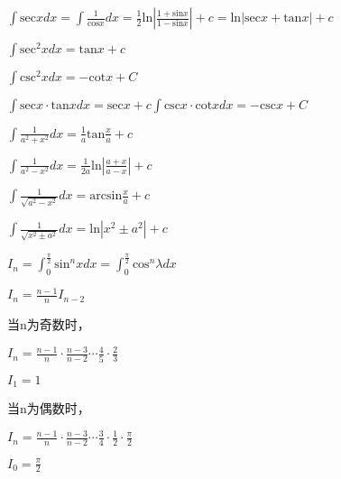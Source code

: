 $\int \mathrm{sec}xdx=\int \frac{1}{\mathrm{cos}x}dx=\frac{1}{2}\mathrm{ln}\left|\frac{1+\mathrm{sin}x}{1-\mathrm{sin}x}\right|+c=\mathrm{ln}\left|\mathrm{sec}x+\mathrm{tan}x\right|+c$

$\int {\mathrm{sec}}^{2}xdx=\mathrm{tan}x+c$

$\int {\mathrm{csc}}^{2}xdx=-\mathrm{cot}x+C$

$\int \mathrm{sec}x\cdot \mathrm{tan}xdx=\mathrm{sec}x+c$$\int \mathrm{csc}x\cdot \mathrm{cot}xdx=-\mathrm{csc}x+C$

$\int \frac{1}{{a}^{2}+{x}^{2}}dx=\frac{1}{a}\mathrm{tan}\frac{x}{a}+c$

$\int \frac{1}{{a}^{2}-{x}^{2}}dx=\frac{1}{2a}\mathrm{ln}\left|\frac{a+x}{a-x}\right|+c$

$\int \frac{1}{\sqrt{{a}^{2}-{x}^{2}}}dx=\mathrm{arcsin}\frac{x}{a}+c$

$\int \frac{1}{\sqrt{{x}^{2}±{a}^{2}}}dx=\mathrm{ln}\left|{x}^{2}±{a}^{2}\right|+c$

${I}_{n}={\int }_{0}^{\frac{\pi }{2}}{\mathrm{sin}}^{n}xdx={\int }_{0}^{\frac{\pi }{2}}{\mathrm{cos}}^{n}\lambda dx$

${I}_{n}=\frac{n-1}{n}{I}_{n-2}$

当n为奇数时，

${I}_{n}=\frac{n-1}{n}\cdot \frac{n-3}{n-2}\cdots \frac{4}{5}\cdot \frac{2}{3}$ 

$I_1 = 1$

当n为偶数时，

${I}_{n}=\frac{n-1}{n}\cdot \frac{n-3}{n-2}\cdots \frac{3}{4}\cdot \frac{1}{2}\cdot \frac{\pi }{2}$ 

$I_0 = \frac{\pi}{2}$



























